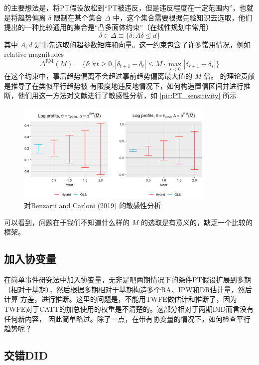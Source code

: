 \documentclass[../didNotes.tex]{subfiles}
\begin{document}
\textcite{rambachan2023} 的主要想法是，将PT假设放松到``PT被违反，但是违反程度在一定范围内''，也就是将趋势偏离 $\delta$ 限制在某个集合
$\Delta$ 中，这个集合需要根据先验知识去选取，他们提出的一种比较通用的集合是``凸多面体约束''（在线性规划中常用）
$$
\delta \in \Delta \equiv \{ \delta: A \delta \le d \}
$$
其中 $A,d$ 是事先选取的超参数矩阵和向量。这一约束包含了许多常用情况，例如relative magnitudes
$$
\Delta^{\text{RM}}(M) = \{ \delta: \forall t \ge 0,\left\vert \delta_{t+1}-\delta_{t} \right\vert \le M \cdot
\max_{s<0} \left\vert \delta_{s+1}-\delta_{s} \right\vert  \}
$$
在这个约束中，事后趋势偏离不会超过事前趋势偏离最大值的 $M$ 倍。\textcite{rambachan2023} 的理论贡献是推导了在类似平行趋势被
有限度地违反地情况下，如何构造置信区间并进行推断，他们用这一方法对文献进行了敏感性分析，如 \autoref{pic:PT_sensitivity} 所示
\begin{figure}[htbp]
  \begin{center}
    \includegraphics[width=0.85\textwidth]{./assets/PT_sensitivity.png}
  \end{center}
  \caption{对Benzarti and Carloni (2019) 的敏感性分析}
  \label{pic:PT_sensitivity}
\end{figure}
可以看到，问题在于我们不知道什么样的 $M$ 的选取是有意义的，缺乏一个比较的框架。

\subsection{加入协变量}

在简单事件研究法中加入协变量，无非是吧两期情况下的条件PT假设扩展到多期（相对于基期），然后根据多期相对于基期构造多个RA、IPW和DR估计量，然后计算
方差，进行推断。这里的问题是，不能用TWFE做估计和推断了，因为TWFE对于CATT的加总使用的权重是不清楚的。这部分相对于两期DID而言没有任何新内容，
因此简单略过。除了一点，在带有协变量的情况下，如何检查平行趋势呢？


\subsection{交错DID}
\end{document}
